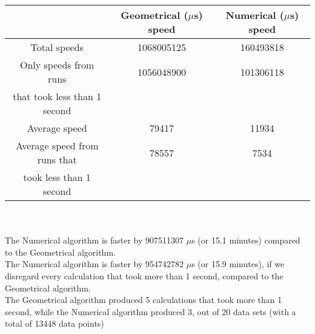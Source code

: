 \begin{tabular}[3]{c|c|c}
 & Geometrical ($\mu$s) speed & Numerical ($\mu$s) speed\\
\hline
Total speeds & 1068005125 & 160493818 \\ 
\hline 
Only speeds from runs & 1056048900 & 101306118 \\ 
that took less than 1 second & & \\ 
\hline
Average speed & 79417 & 11934 \\
\hline
Average speed from runs that & 78557 & 7534 \\ 
took less than 1 second & & \\ 
\end{tabular}\\ \\
The Numerical algorithm is faster by 907511307 $\mu$s (or 15.1 minutes) compared to the Geometrical algorithm.\\
The Numerical algorithm is faster by 954742782 $\mu$s (or 15.9 minutes), if we disregard every calculation that took more than 1 second, compared to the Geometrical algorithm.\\
The Geometrical algorithm produced 5 calculations that took more than 1 second, while the Numerical algorithm produced 3, out of 20 data sets (with a total of 13448 data points)\\
